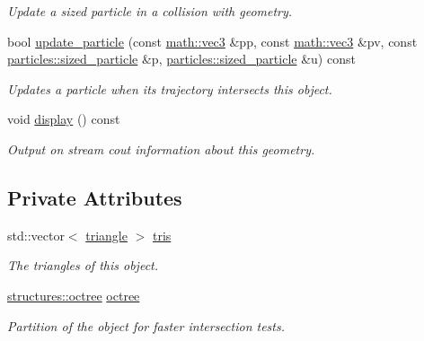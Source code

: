 \begin{DoxyCompactItemize}
\begin{DoxyCompactList}\small\item\em Update a sized particle in a collision with geometry. \end{DoxyCompactList}\item 
bool \hyperlink{classphysim_1_1geometric_1_1object_a781f069a0b1a3ebc740382db21ec629c}{update\+\_\+particle} (const \hyperlink{structphysim_1_1math_1_1vec3}{math\+::vec3} \&pp, const \hyperlink{structphysim_1_1math_1_1vec3}{math\+::vec3} \&pv, const \hyperlink{classphysim_1_1particles_1_1sized__particle}{particles\+::sized\+\_\+particle} \&p, \hyperlink{classphysim_1_1particles_1_1sized__particle}{particles\+::sized\+\_\+particle} \&u) const
\begin{DoxyCompactList}\small\item\em Updates a particle when its trajectory intersects this object. \end{DoxyCompactList}\item 
\mbox{\label{classphysim_1_1geometric_1_1object_ae1124726aaf9819fda672674c69f6d6c}} 
void \hyperlink{classphysim_1_1geometric_1_1object_ae1124726aaf9819fda672674c69f6d6c}{display} () const
\begin{DoxyCompactList}\small\item\em Output on stream {\itshape cout} information about this geometry. \end{DoxyCompactList}\end{DoxyCompactItemize}
\subsection*{Private Attributes}
\begin{DoxyCompactItemize}
\item 
\mbox{\label{classphysim_1_1geometric_1_1object_a0a7ba3bc4dda95651acdc046342e437c}} 
std\+::vector$<$ \hyperlink{classphysim_1_1geometric_1_1triangle}{triangle} $>$ \hyperlink{classphysim_1_1geometric_1_1object_a0a7ba3bc4dda95651acdc046342e437c}{tris}
\begin{DoxyCompactList}\small\item\em The triangles of this object. \end{DoxyCompactList}\item 
\mbox{\label{classphysim_1_1geometric_1_1object_a4f588a490ec8a223b5229c6e7dba5295}} 
\hyperlink{classphysim_1_1structures_1_1octree}{structures\+::octree} \hyperlink{classphysim_1_1geometric_1_1object_a4f588a490ec8a223b5229c6e7dba5295}{octree}
\begin{DoxyCompactList}\small\item\em Partition of the object for faster intersection tests. \end{DoxyCompactList}\end{DoxyCompactItemize}
